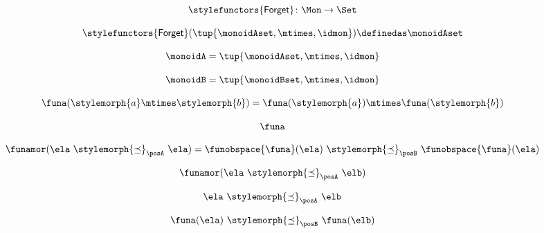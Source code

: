 \begin{forslides}
\begin{forslides}
    \begin{equation}
        \label{eq:slides-translation-14}
        \stylefunctors{\mathsf{Forget}} \colon \Mon \to \Set
    \end{equation}

    \begin{equation}
        \label{eq:slides-translation-15}
        \stylefunctors{\mathsf{Forget}}(\tup{{\monoidAset}, \mtimes, \idmon}) \definedas \monoidAset
    \end{equation}

    \begin{equation}
        \label{eq:slides-translation-16}
        \monoidA = \tup{{\monoidAset}, \mtimes, \idmon}
    \end{equation}

    \begin{equation}
        \label{eq:slides-translation-17}
       \monoidB = \tup{{\monoidBset}, \mtimes, \idmon}
    \end{equation}

    \begin{equation}
        \label{eq:slides-translation-18}
        \funa ( \stylemorph{a} \mtimes \stylemorph{b} ) =  \funa(\stylemorph{a}) \mtimes \funa(\stylemorph{b})
    \end{equation}

    \begin{equation}
        \label{eq:slides-translation-19}
        \funa
    \end{equation}

    \begin{equation}
        \label{eq:slides-translation-20}
        \funamor (\ela \ \stylemorph{\preceq}_\posA \  \ela) = \funobspace{\funa} (\ela) \ \stylemorph{\preceq}_\posB \ \funobspace{\funa} (\ela)
    \end{equation}

    \begin{equation}
        \label{eq:slides-translation-21}
        \funamor (\ela \ \stylemorph{\preceq}_\posA \  \elb)
    \end{equation}

    \begin{equation}
        \label{eq:slides-translation-22}
        \ela \ \stylemorph{\preceq}_\posA \  \elb
    \end{equation}

    \begin{equation}
        \label{eq:slides-translation-23}
        \funa(\ela) \ \stylemorph{\preceq}_\posB \ \funa (\elb)
    \end{equation}


\end{forslides}
\end{forslides}
